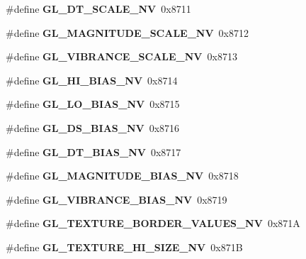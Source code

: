 \begin{DoxyCompactItemize}
\item 
\#define {\bfseries G\+L\+\_\+\+D\+T\+\_\+\+S\+C\+A\+L\+E\+\_\+\+N\+V}~0x8711\label{_s_d_l__opengl_8h_a37ac4870954fd3742af4dd081150980d}

\item 
\#define {\bfseries G\+L\+\_\+\+M\+A\+G\+N\+I\+T\+U\+D\+E\+\_\+\+S\+C\+A\+L\+E\+\_\+\+N\+V}~0x8712\label{_s_d_l__opengl_8h_abb9a087a2bfc6fe0b0083abde44a989d}

\item 
\#define {\bfseries G\+L\+\_\+\+V\+I\+B\+R\+A\+N\+C\+E\+\_\+\+S\+C\+A\+L\+E\+\_\+\+N\+V}~0x8713\label{_s_d_l__opengl_8h_a03b3a3440b477229145186c91b4621c6}

\item 
\#define {\bfseries G\+L\+\_\+\+H\+I\+\_\+\+B\+I\+A\+S\+\_\+\+N\+V}~0x8714\label{_s_d_l__opengl_8h_aea516ed2fe457c55c85ee94cdb1beac2}

\item 
\#define {\bfseries G\+L\+\_\+\+L\+O\+\_\+\+B\+I\+A\+S\+\_\+\+N\+V}~0x8715\label{_s_d_l__opengl_8h_af7d601b3102a184f3e2b13436bf4027b}

\item 
\#define {\bfseries G\+L\+\_\+\+D\+S\+\_\+\+B\+I\+A\+S\+\_\+\+N\+V}~0x8716\label{_s_d_l__opengl_8h_aa952c67aca4187cfd340804f03c83f7b}

\item 
\#define {\bfseries G\+L\+\_\+\+D\+T\+\_\+\+B\+I\+A\+S\+\_\+\+N\+V}~0x8717\label{_s_d_l__opengl_8h_a54979ea6eeae6eefc70f6022c72ad235}

\item 
\#define {\bfseries G\+L\+\_\+\+M\+A\+G\+N\+I\+T\+U\+D\+E\+\_\+\+B\+I\+A\+S\+\_\+\+N\+V}~0x8718\label{_s_d_l__opengl_8h_ae0755c87969dbab728fc24055f92e6bb}

\item 
\#define {\bfseries G\+L\+\_\+\+V\+I\+B\+R\+A\+N\+C\+E\+\_\+\+B\+I\+A\+S\+\_\+\+N\+V}~0x8719\label{_s_d_l__opengl_8h_a07661ce478d35f45b9987dc799900c56}

\item 
\#define {\bfseries G\+L\+\_\+\+T\+E\+X\+T\+U\+R\+E\+\_\+\+B\+O\+R\+D\+E\+R\+\_\+\+V\+A\+L\+U\+E\+S\+\_\+\+N\+V}~0x871\+A\label{_s_d_l__opengl_8h_ac27b09140276f0c0be05810bfcdecd25}

\item 
\#define {\bfseries G\+L\+\_\+\+T\+E\+X\+T\+U\+R\+E\+\_\+\+H\+I\+\_\+\+S\+I\+Z\+E\+\_\+\+N\+V}~0x871\+B\label{_s_d_l__opengl_8h_af06bbc3cc0c8a58695d51eecc4a46266}


\end{DoxyCompactItemize}

